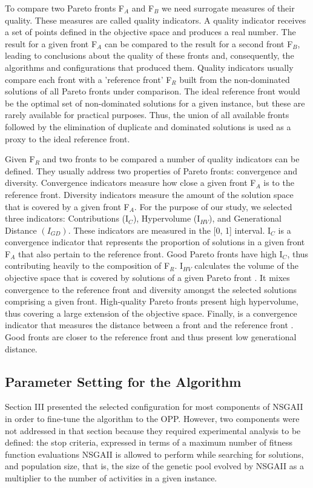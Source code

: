 \documentclass[conference]{IEEEtran}
\begin{document}
To compare two Pareto fronts F$_{A}$ and F$_{B}$ we need surrogate measures of their quality. These measures are called quality indicators. A quality indicator receives a set of points defined in the objective space and produces a real number. The result for a given front F$_{A}$ can be compared to the result for a second front F$_{B}$, leading to conclusions about the quality of these fronts and, consequently, the algorithms and configurations that produced them. Quality indicators usually compare each front with a 'reference front' F$_{R}$ built from the non-dominated solutions of all Pareto fronts under comparison. The ideal reference front would be the optimal set of non-dominated solutions for a given instance, but these are rarely available for practical purposes. Thus, the union of all available fronts followed by the elimination of duplicate and dominated solutions is used as a proxy to the ideal reference front. 

Given F$_{R}$ and two fronts to be compared a number of quality indicators can be defined. They usually address two properties of Pareto fronts: convergence and diversity. Convergence indicators measure how close a given front F$_{A}$ is to the reference front. Diversity indicators measure the amount of the solution space that is covered by a given front F$_{A}$. For the purpose of our study, we selected three indicators: Contributions (I$_{C}$), Hypervolume (I$_{HV}$), and Generational Distance $(I_{GD})$. These indicators are measured in the [0, 1] interval. I$_{C}$ is a convergence indicator that represents the proportion of solutions in a given front F$_{A}$ that also pertain to the reference front. Good Pareto fronts have high I$_{C}$, thus contributing heavily to the composition of F$_{R}$. I$_{HV}$ calculates the volume of the objective space that is covered by solutions of a given Pareto front \cite{Durillo:2009}. It mixes convergence to the reference front and diversity amongst the selected solutions comprising a given front. High-quality Pareto fronts present high hypervolume, thus covering a large extension of the objective space. Finally,  is a convergence indicator that measures the distance between a front and the reference front \cite{vanveldhuizen:1998}. Good fronts are closer to the reference front and thus present low generational distance.

\subsection{Parameter Setting for the Algorithm}
Section III presented the selected configuration for most components of NSGAII in order to fine-tune the algorithm to the OPP. However, two components were not addressed in that section because they required experimental analysis to be defined: the stop criteria, expressed in terms of a maximum number of fitness function evaluations NSGAII is allowed to perform while searching for solutions, and population size, that is, the size of the genetic pool evolved by NSGAII as a multiplier to the number of activities in a given instance.
\end{document}
